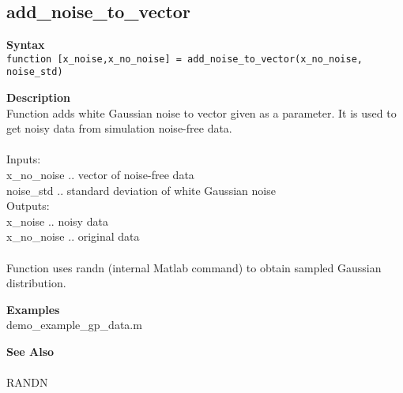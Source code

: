 \subsection*{add\_noise\_to\_vector} \label{fun:add_noise_to_vector}


\textbf{Syntax}
\\ \texttt{function [x\_noise,x\_no\_noise] = add\_noise\_to\_vector(x\_no\_noise,
noise\_std)}

\textbf{Description}
\\ Function adds white Gaussian noise to vector given as a parameter.
 It is used to get noisy data from simulation noise-free data.
 \\
\\ Inputs:
\\ x\_no\_noise .. vector of noise-free data
\\ noise\_std .. standard deviation of white Gaussian noise
\\ Outputs:
\\ x\_noise .. noisy data
\\ x\_no\_noise .. original data
\\
\\ Function uses randn (internal Matlab command) to obtain sampled Gaussian
\\ distribution.

\textbf{Examples}
\\ demo\_example\_gp\_data.m

\textbf{See Also}
\\
\\ RANDN
